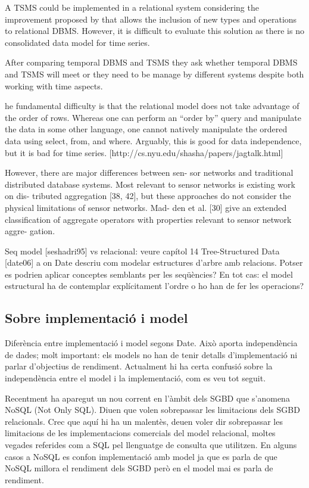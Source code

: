 A TSMS could be implemented in a relational system considering the improvement proposed by \textcite{stonebraker86} that allows the inclusion of new types and operations to relational DBMS. However, it is difficult to evaluate this solution as there is no consolidated data model  for time series. 

After comparing temporal DBMS and TSMS \parencite{schmidt95} they ask whether temporal DBMS and TSMS will meet or they need to be manage by different systems despite both working with time aspects.


he fundamental difficulty is that the relational model does not take advantage of the order of rows. Whereas one can perform an ``order by'' query and manipulate the data in some other language, one cannot natively manipulate the ordered data using select, from, and where. 
Arguably, this is good for data independence, but it is bad for time series.
[http://cs.nyu.edu/shasha/papers/jagtalk.html]

        However, there are major differences between sen-
sor networks and traditional distributed database systems.
Most relevant to sensor networks is existing work on dis-
tributed aggregation [38, 42], but these approaches do not
consider the physical limitations of sensor networks. Mad-
den et al. [30] give an extended classification of aggregate
operators with properties relevant to sensor network aggre-
gation. %


Seq model [seshadri95] vs relacional: veure capítol 14 Tree-Structured Data [date06] a on Date descriu com modelar estructures d'arbre amb relacions. Potser es podrien aplicar conceptes semblants per les seqüències? En tot cas: el model estructural ha de contemplar explícitament l'ordre o ho han de fer les operacions?

\subsection{Sobre implementació i model}

Diferència entre implementació i model segons Date. Això aporta independència de dades; molt important: els models no han de tenir detalls d'implementació ni parlar d'objectius de rendiment.
Actualment hi ha certa confusió sobre la independència entre el model i la implementació, com es veu tot seguit.


Recentment ha aparegut un nou corrent en l'àmbit dels SGBD que s'anomena NoSQL (Not Only SQL). Diuen que volen sobrepassar les limitacions dels SGBD relacionals. Crec que aquí hi ha un malentès, deuen voler dir sobrepassar les limitacions de les implementacions comercials del model relacional, moltes vegades referides com a SQL pel llenguatge de consulta que utilitzen. En alguns casos a NoSQL es confon implementació amb model ja que es parla de que NoSQL millora el rendiment dels SGBD però en el model mai es parla de rendiment. 

